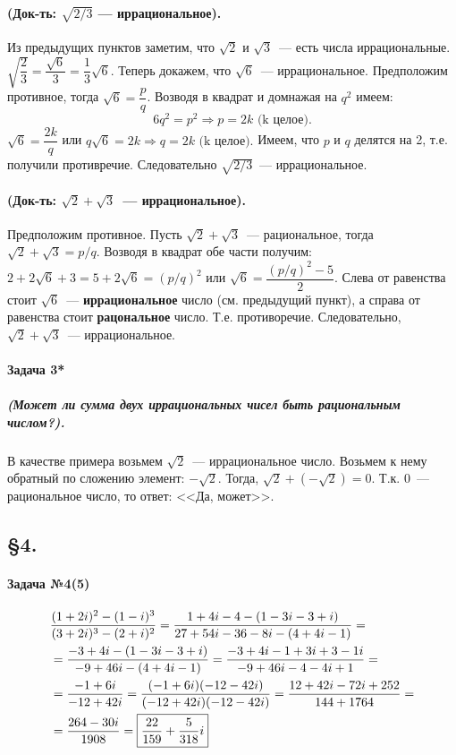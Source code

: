 \documentclass[a4paper,12pt]{report}
\begin{document}
\paragraph{(Док-ть: $ \sqrt{2/3} $ --- иррациональное).}
Из предыдущих пунктов заметим, что $ \sqrt{2} $ и
$ \sqrt{3} $~--- есть числа иррациональные.
$ \sqrt{\dfrac{2}{3}}=\dfrac{\sqrt{6}}{3}=\dfrac{1}{3}\sqrt{6} $.
Теперь докажем, что $ \sqrt{6} $~--- иррациональное. 
Предположим противное, тогда $ \sqrt{6}=\dfrac{p}{q} $.
Возводя в квадрат и домнажая на $ q^2 $ имеем: $$ 6q^2=p^2 
\Rightarrow p=2k \text{ (k целое).}$$ 
$ \sqrt{6}=\dfrac{2k}{q} $ или $ q\sqrt{6}=2k \Rightarrow q=2k\text{ (k целое).}$  Имеем, что $ p $ и $ q $ делятся на 2, т.е. получили противречие. Следовательно $ \sqrt{2/3} $~--- иррациональное.

\paragraph{(Док-ть: $ \sqrt{2} + \sqrt{3} $~--- иррациональное).}
Предположим противное.
Пусть $ \sqrt{2} + \sqrt{3} $~--- рациональное, тогда
$ \sqrt{2} + \sqrt{3} = p/q $. Возводя в квадрат обе части получим: 
$ 2 + 2\sqrt{6} + 3 = 
5 + 2\sqrt{6} = (p/q)^2 $ или 
$ \sqrt{6}= \dfrac{(p/q)^2 - 5}{2} $.  
Слева от равенства стоит $ \sqrt{6} $~--- \textbf{иррациональное} 
число (см. предыдущий пункт), а справа от равенства 
стоит \textbf{рацональное} число. Т.е. противоречие.
Следовательно, $ \sqrt{2} + \sqrt{3} $~--- иррациональное.

\paragraph{Задача 3*}
\subparagraph{(Может ли сумма двух иррациональных чисел быть рациональным числом?).} 
В качестве примера возьмем $ \sqrt{2} $~--- иррациональное число.
Возьмем к нему обратный по сложению элемент: $ -\sqrt{2} $. Тогда,
$ \sqrt{2} + (-\sqrt{2}) = 0 $. Т.к. 0~--- рациональное число, то 
ответ: <<Да, может>>.

\subsection{\S4.\\}

\paragraph{Задача №4(5)}

\begin{align*}
	&\dfrac{(1+2i)^2-(1-i)^3}{(3+2i)^3-(2+i)^2}=
	\dfrac{1+4i-4-(1-3i-3+i)}{27+54i-36-8i-(4+4i-1)}=\\
	&=\dfrac{-3+4i-(1-3i-3+i)}{-9+46i-(4+4i-1)}=
	\dfrac{-3+4i-1+3i+3-1i}{-9+46i-4-4i+1}=\\
	&=\dfrac{-1+6i}{-12+42i}=
	\dfrac{(-1+6i)(-12-42i)}{(-12+42i)(-12-42i)}=
	\dfrac{12+42i-72i+252}{144+1764}=\\
	&=\dfrac{264-30i}{1908}=
	\fbox{$ \dfrac{22}{159}+\dfrac{5}{318}i $} 
\end{align*}
\end{document}
